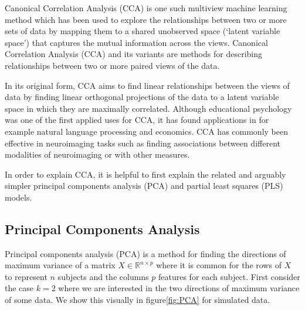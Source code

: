 Canonical Correlation Analysis (CCA)\cite{hotelling1935canonical} is one such multiview machine learning method which has been used to explore the relationships between two or more sets of data by mapping them to a shared unobserved space (`latent variable space') that captures the mutual information across the views. Canonical Correlation Analysis (CCA) and its variants are methods for describing relationships between two or more paired views of the data\cite{uurtio2017tutorial}.

In its original form\cite{hotelling1935canonical}, CCA aims to find linear relationships between the views of data by finding linear orthogonal projections of the data to a latent variable space in which they are maximally correlated. Although educational psychology was one of the first applied uses for CCA, it has found applications in for example natural language processing\cite{dhillon2011multi} and economics\cite{vinod1978survey}. CCA has commonly been effective in neuroimaging tasks such as finding associations between different modalities of neuroimaging or with other measures\cite{wang2018finding}.

In order to explain CCA, it is helpful to first explain the related and arguably simpler principal components analysis (PCA) and partial least squares (PLS) models.

\subsection{Principal Components Analysis}\label{pca}

Principal components analysis (PCA)\cite{hotelling1933analysis} is a method for finding the directions of maximum variance of a matrix $X \in \mathbb{R}^{n \times p}$  where it is common for the rows of $X$ to represent $n$ subjects and the columns $p$ features for each subject. First consider the case $k=2$ where we are interested in the two directions of maximum variance of some data. We show this visually in figure\ref{fig:PCA} for simulated data.

